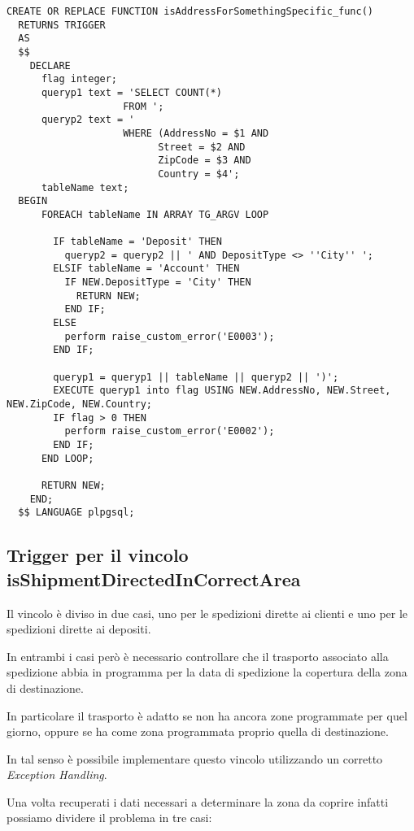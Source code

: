 \newpage
\begin{lstlisting}[caption={Creazione della funzione \textbf{isAddressForSomethingSpecific\_func}}]
  CREATE OR REPLACE FUNCTION isAddressForSomethingSpecific_func()
  RETURNS TRIGGER
  AS 
  $$
    DECLARE 
      flag integer;
      queryp1 text = 'SELECT COUNT(*) 
                    FROM ';
      queryp2 text = ' 
                    WHERE (AddressNo = $1 AND 
                          Street = $2 AND 
                          ZipCode = $3 AND  
                          Country = $4';
      tableName text;
  BEGIN
      FOREACH tableName IN ARRAY TG_ARGV LOOP
  
        IF tableName = 'Deposit' THEN
          queryp2 = queryp2 || ' AND DepositType <> ''City'' ';
        ELSIF tableName = 'Account' THEN
          IF NEW.DepositType = 'City' THEN
            RETURN NEW;
          END IF;
        ELSE 
          perform raise_custom_error('E0003');
        END IF;
            
        queryp1 = queryp1 || tableName || queryp2 || ')';
        EXECUTE queryp1 into flag USING NEW.AddressNo, NEW.Street, NEW.ZipCode, NEW.Country;
        IF flag > 0 THEN
          perform raise_custom_error('E0002');
        END IF;
      END LOOP;
  
      RETURN NEW;
    END;
  $$ LANGUAGE plpgsql;
\end{lstlisting}

\subsection{Trigger per il vincolo \textbf{isShipmentDirectedInCorrectArea}}

Il vincolo è diviso in due casi, uno per le spedizioni dirette ai clienti e uno per le spedizioni dirette ai depositi.

In entrambi i casi però è necessario controllare che il trasporto associato alla spedizione abbia in programma per la data di spedizione la copertura della zona di destinazione.

In particolare il trasporto è adatto se non ha ancora zone programmate per quel giorno, oppure se ha come zona programmata proprio quella di destinazione.

In tal senso è possibile implementare questo vincolo utilizzando un corretto \textit{Exception Handling}.

Una volta recuperati i dati necessari a determinare la zona da coprire infatti possiamo dividere il problema in tre casi:

